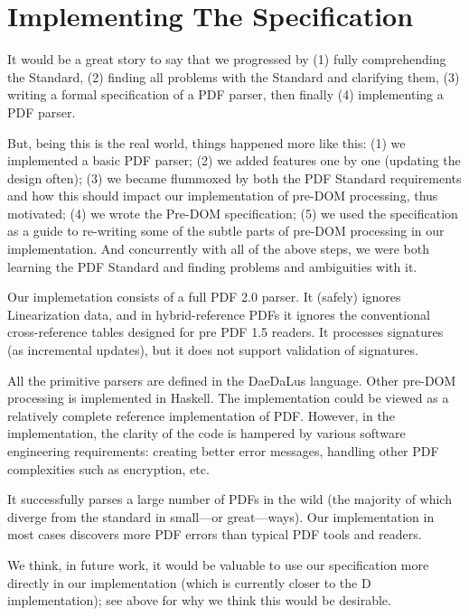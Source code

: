 \section{Implementing The Specification}
\label{sec:implementation}

It would be a great story to say that we progressed by
(1) fully comprehending the Standard,
(2) finding all problems with the Standard and clarifying them,
(3) writing a formal specification of a PDF parser,
then finally (4) implementing a PDF parser.

But, being this is the real world, things happened more like this:
(1) we implemented a basic PDF parser;
(2) we added features one by one (updating the design often);
(3) we became flummoxed by both the PDF Standard requirements and how this
should impact our implementation of pre-DOM processing, thus motivated;
(4) we wrote the Pre-DOM specification;
(5) we used the specification as a guide to re-writing some of
the subtle parts of pre-DOM processing in our implementation.
%
And concurrently with all of the above steps, we were both learning the PDF
Standard and finding problems and ambiguities with it.

Our implemetation consists of a full PDF 2.0 parser.  It (safely) ignores
Linearization data, and in hybrid-reference PDFs it ignores the conventional
cross-reference tables designed for pre PDF 1.5 readers.  It processes
signatures (as incremental updates), but it does not support validation of
signatures.

All the primitive parsers are defined in the DaeDaLus \cite{daedalusrepo}
language.
Other pre-DOM processing is implemented in Haskell.
The implementation could be viewed as a relatively complete reference 
implementation of PDF.
However, in the implementation, 
the clarity of the code is hampered by various software engineering
requirements:
creating better error messages,
handling other PDF complexities such as encryption,
etc.

It successfully parses a large number of PDFs in the wild
(the majority of which diverge from the standard in small---or great---ways).
Our implementation in most cases discovers more PDF errors than
typical PDF tools and readers.

We think, in future work, it would be valuable to use our specification more
directly in our implementation (which is currently closer to the D
implementation);
%
see  above for why we think this would be
desirable.

% 
 
